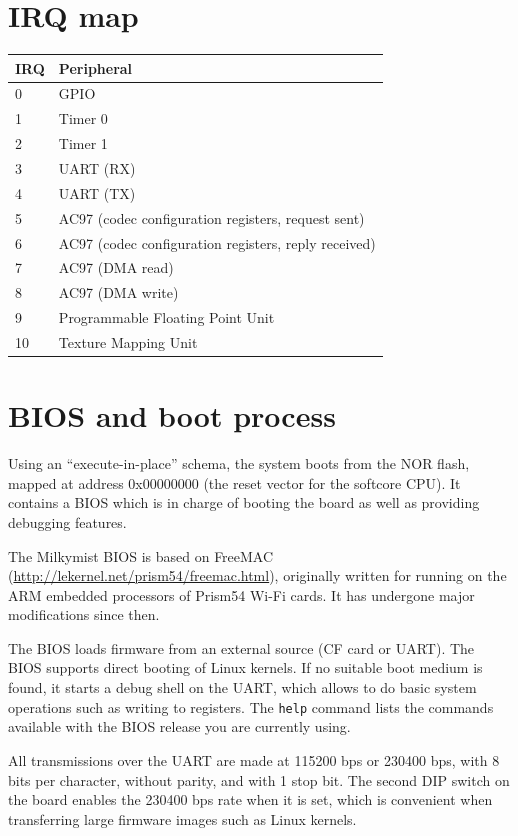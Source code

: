 \documentclass[a4paper,11pt]{article}
\begin{document}
\section{IRQ map}
\begin{tabular}{|l|p{13cm}|}
\hline
\bf{IRQ} & \bf{Peripheral} \\
\hline
0 & GPIO \\
\hline
1 & Timer 0 \\
\hline
2 & Timer 1 \\
\hline
3 & UART (RX)\\
\hline
4 & UART (TX)\\
\hline
5 & AC97 (codec configuration registers, request sent)\\
\hline
6 & AC97 (codec configuration registers, reply received)\\
\hline
7 & AC97 (DMA read)\\
\hline
8 & AC97 (DMA write)\\
\hline
9 & Programmable Floating Point Unit\\
\hline
10 & Texture Mapping Unit\\
\hline
\end{tabular}

\section{BIOS and boot process}
Using an ``execute-in-place'' schema, the system boots from the NOR flash, mapped at address 0x00000000 (the reset vector for the softcore CPU). It contains a BIOS which is in charge of booting the board as well as providing debugging features.

The Milkymist BIOS is based on FreeMAC (\url{http://lekernel.net/prism54/freemac.html}), originally written for running on the ARM embedded processors of Prism54 Wi-Fi cards. It has undergone major modifications since then.

The BIOS loads firmware from an external source (CF card or UART). The BIOS supports direct booting of Linux kernels. If no suitable boot medium is found, it starts a debug shell on the UART, which allows to do basic system operations such as writing to registers. The \verb!help! command lists the commands available with the BIOS release you are currently using.

All transmissions over the UART are made at 115200 bps or 230400 bps, with 8 bits per character, without parity, and with 1 stop bit. The second DIP switch on the board enables the 230400 bps rate when it is set, which is convenient when transferring large firmware images such as Linux kernels.
\end{document}
